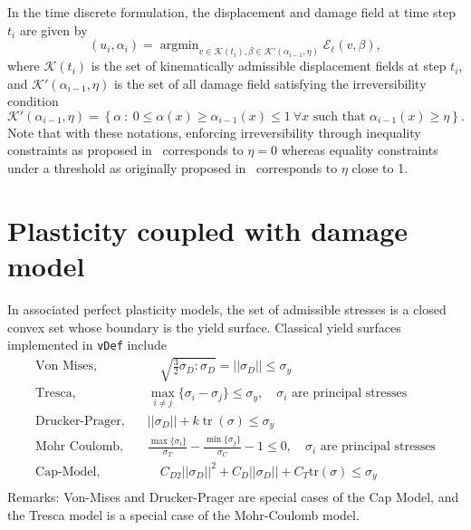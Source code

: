 \documentclass[10pt,oneside]{memoir}
\def\vDef{{\texttt{vDef}} }
\DeclareMathOperator*{\argmin}{argmin}
\DeclareMathOperator{\tr}{tr}
\begin{document}
In the time discrete formulation, the displacement and damage field at time step $t_i$ are given by
\begin{equation}
	\label{eq:globMin}
	(u_i,\alpha_i) = \argmin_{v \in \mathcal{K}(t_i), \beta \in \mathcal{K}'(\alpha_{i-1},\eta)} \mathcal{E}_\ell(v,\beta),
\end{equation}
where $\mathcal{K}(t_i)$ is the set of kinematically admissible displacement fields at step $t_i$, and $\mathcal{K}'(\alpha_{i-1},\eta)$ is the set of all damage field satisfying the irreversibility condition
$$
	\mathcal{K}'(\alpha_{i-1},\eta) = \left\{\alpha \ :\  0 \le \alpha(x) \ge \alpha_{i-1}(x) \le 1 \ \forall x \text{ such that } \alpha_{i-1}(x) \ge \eta\right\}.
$$
Note that with these notations, enforcing irreversibility through inequality constraints as proposed in~\cite{Giacomini-2005,Amor-Marigo-EtAl-2008a,Pham-Amor-EtAl-2011a} corresponds to $\eta = 0$ whereas equality constraints under a threshold as originally proposed in~\cite{Bourdin-Francfort-EtAl-2000a} corresponds to $\eta$ close to 1.


\section{Plasticity coupled with damage model}



In associated perfect plasticity models, the set of admissible stresses is a closed convex set whose boundary is the yield surface. 
Classical yield surfaces implemented in \vDef include
\begin{equation}
\begin{split}
\text{Von Mises},\quad& \quad \sqrt{\frac{3}{2}\sigma_D:\sigma_D} = ||\sigma_D|| \leq \sigma_y  \\
\text{Tresca},\quad& \max_{i\neq j} \{ \sigma_i - \sigma_j \} \leq \sigma _y ,\quad  \sigma_i \text{ are principal stresses}   \\
\text{Drucker-Prager},\quad& ||\sigma_D || + k \tr(\sigma) \leq \sigma_y \\
\text{Mohr Coulomb},\quad& \frac{\max\{\sigma_i\}}{\sigma_T} - \frac{\min\{\sigma_j\}}{\sigma_C} -1 \leq 0 ,\quad  \sigma_i \text{ are principal stresses}  \\
\text{Cap-Model},\quad& \quad C_{D2} ||\sigma_D||^2 + C_D||\sigma_D|| + C_T \text{tr} (\sigma) \leq \sigma_y \\
\end{split}
\end{equation}
Remarks: Von-Mises and Drucker-Prager are special cases of the Cap Model, and the  Tresca model is a special case of the Mohr-Coulomb model.
\end{document}
